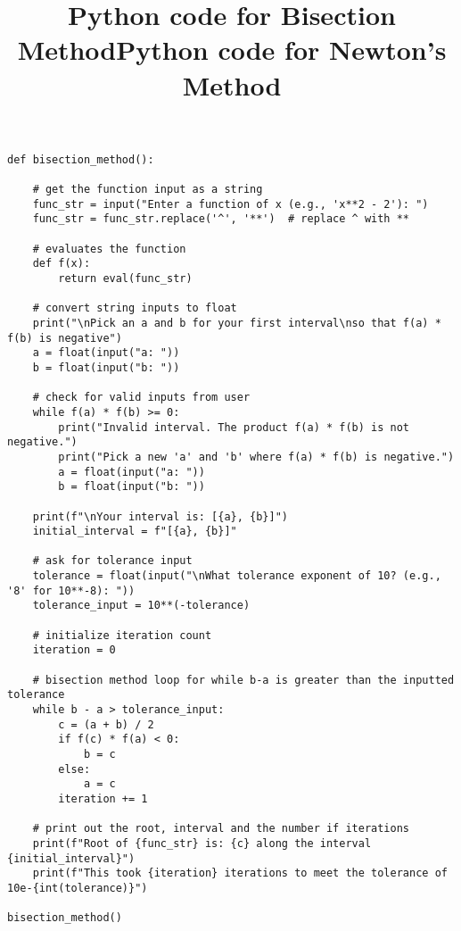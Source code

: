 \documentclass[9pt]{extarticle}
\begin{document}
\clearpage
\begin{center}
    \title{Python code for Bisection Method}
\end{center}

\begin{lstlisting}
def bisection_method():
    
    # get the function input as a string
    func_str = input("Enter a function of x (e.g., 'x**2 - 2'): ")
    func_str = func_str.replace('^', '**')  # replace ^ with ** 

    # evaluates the function
    def f(x):
        return eval(func_str)  

    # convert string inputs to float
    print("\nPick an a and b for your first interval\nso that f(a) * f(b) is negative")
    a = float(input("a: "))
    b = float(input("b: "))

    # check for valid inputs from user
    while f(a) * f(b) >= 0:
        print("Invalid interval. The product f(a) * f(b) is not negative.")
        print("Pick a new 'a' and 'b' where f(a) * f(b) is negative.")
        a = float(input("a: "))
        b = float(input("b: "))

    print(f"\nYour interval is: [{a}, {b}]")
    initial_interval = f"[{a}, {b}]"

    # ask for tolerance input
    tolerance = float(input("\nWhat tolerance exponent of 10? (e.g., '8' for 10**-8): "))
    tolerance_input = 10**(-tolerance)

    # initialize iteration count
    iteration = 0
    
    # bisection method loop for while b-a is greater than the inputted tolerance
    while b - a > tolerance_input:
        c = (a + b) / 2
        if f(c) * f(a) < 0:
            b = c
        else:
            a = c
        iteration += 1
    
    # print out the root, interval and the number if iterations
    print(f"Root of {func_str} is: {c} along the interval {initial_interval}")
    print(f"This took {iteration} iterations to meet the tolerance of 10e-{int(tolerance)}")

bisection_method()
\end{lstlisting}

\clearpage
\begin{center}
    \title{Python code for Newton's Method}
    
\end{center}
\end{document}

